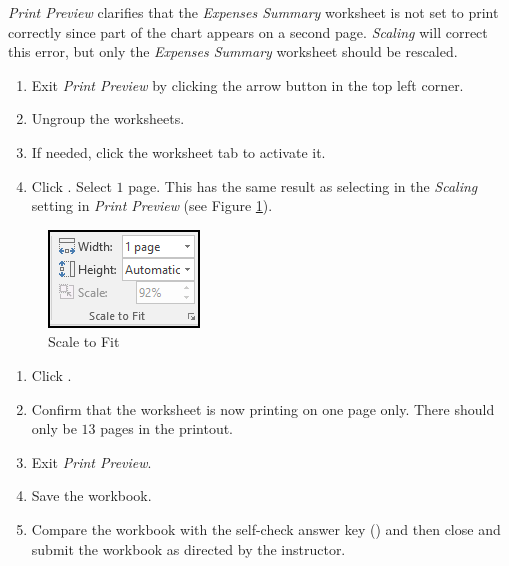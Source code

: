 \textit{Print Preview} clarifies that the \textit{Expenses Summary} worksheet is not set to print correctly since part of the chart appears on a second page. \textit{Scaling} will correct this error, but only the \textit{Expenses Summary} worksheet should be rescaled.

\begin{enumbox}
	\begin{enumerate}
		\item Exit \textit{Print Preview} by clicking the arrow button in the top left corner.
		\item Ungroup the worksheets.
		\item If needed, click the  worksheet tab to activate it.
		\item Click . Select $ 1 $ page. This has the same result as selecting  in the \textit{Scaling} setting in \textit{Print Preview} (see Figure \ref{06:fig16}).
	\end{enumerate}
\end{enumbox}

\begin{figure}[H]
	\centering
	\includegraphics[width=\maxwidth{.35\linewidth}]{gfx/ch06_fig16}
	\caption{Scale to Fit}
	\label{06:fig16}
\end{figure}

\begin{enumbox}
	\begin{enumerate}
		\item Click .
		\item Confirm that the  worksheet is now printing on one page only. There should only be $ 13 $ pages in the printout.
		\item Exit \textit{Print Preview}.
		\item Save the  workbook.
		\item Compare the workbook with the self-check answer key () and then close and submit the  workbook as directed by the instructor.
	\end{enumerate}
\end{enumbox}
	
